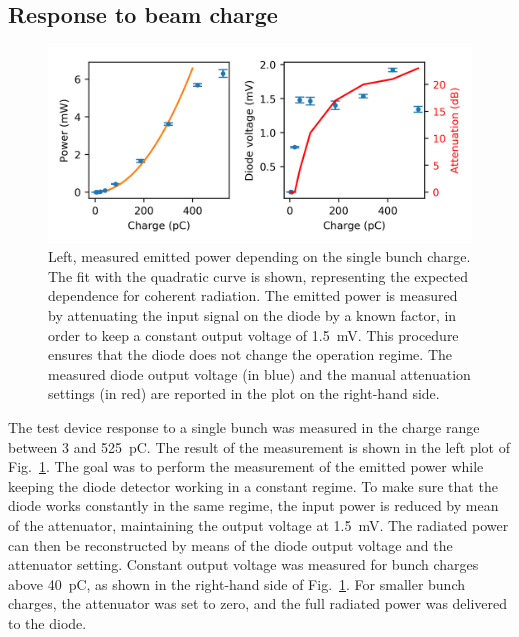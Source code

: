 \subsection{Response to beam charge}

\begin{figure}[!t]
\centering
\hspace{40mm}
\includegraphics[scale=1, keepaspectratio]{pictures/Charge_scan}
\caption{Left, measured emitted power depending on the single bunch charge. The fit with the quadratic curve is shown, representing the expected dependence for coherent radiation. The emitted power is measured by attenuating the input signal on the diode by a known factor, in order to keep a constant output voltage of 1.5~mV. This procedure ensures that the diode does not change the operation regime. The measured diode output voltage (in blue) and the manual attenuation settings (in red) are reported in the plot on the right-hand side.}
\label{fig:charge_scan_single_wg}
\end{figure} 

The test device response to a single bunch was measured in the charge range between 3 and 525~pC. The result of the measurement is shown in the left plot of Fig.~\ref{fig:charge_scan_single_wg}. The goal was to perform the measurement of the emitted power while keeping the diode detector working in a constant regime. To make sure that the diode works constantly in the same regime, the input power is reduced by mean of the attenuator, maintaining the output voltage at 1.5~mV. The radiated power can then be reconstructed by means of the diode output voltage and the attenuator setting. Constant output voltage was measured for bunch charges above 40~pC, as shown in the right-hand side of Fig.~\ref{fig:charge_scan_single_wg}. For smaller bunch charges, the attenuator was set to zero, and the full radiated power was delivered to the diode. 

